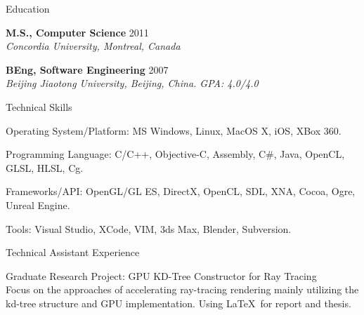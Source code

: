 \documentclass[10pt]{article}
\newenvironment{mydescription}{%
    \begin{description}
        \setlength{\itemsep}{0.25em}%
        \setlength{\parsep}{0em}%
        \setlength{\topsep}{\itemsep}%
        \setlength{\parskip}{0em}%
        \setlength{\labelwidth}{0.1em}
        \setlength{\labelsep}{0em} 
    }%
{\end{description}}
\begin{document}
\begin{cv}
\begin{cvlist}{Education}
    
    \item   \textbf{M.S., Computer Science} \hfill 2011 \\ 
            \emph{Concordia University, Montreal, Canada}
    \item   \textbf{BEng, Software Engineering} \hfill 2007 \\
            \emph{Beijing Jiaotong University, Beijing, China. GPA: 4.0/4.0}
\end{cvlist}

\begin{cvlist}{Technical Skills}
\item
    \begin{mydescription} 
        \item Operating System/Platform: \hspace{0.1em} 
            MS Windows, Linux, MacOS X, iOS, XBox 360.
        \item Programming Language: \hspace{0.1em} 
            C/C++, Objective-C, Assembly, C\#, Java, OpenCL, GLSL, HLSL, Cg.
        \item Frameworks/API: \hspace{0.1em} 
            OpenGL/GL ES, DirectX, OpenCL, SDL, XNA, Cocoa, Ogre, Unreal Engine.  
        \item Tools: \hspace{0.1em} 
            Visual Studio, XCode, VIM, 3ds Max, Blender, Subversion.
    \end{mydescription} 
\end{cvlist} 


\begin{cvlist}{Technical Assistant Experience}
\item
    \begin{mydescription}
        \item[Graduate Research Project: GPU KD-Tree Constructor for Ray Tracing] \hfill \\
            Focus on the approaches of accelerating ray-tracing rendering mainly utilizing the kd-tree structure and GPU implementation. Using \LaTeX\ for report and thesis.    


\end{mydescription}
\end{cvlist}
\end{cv}
\end{document}
